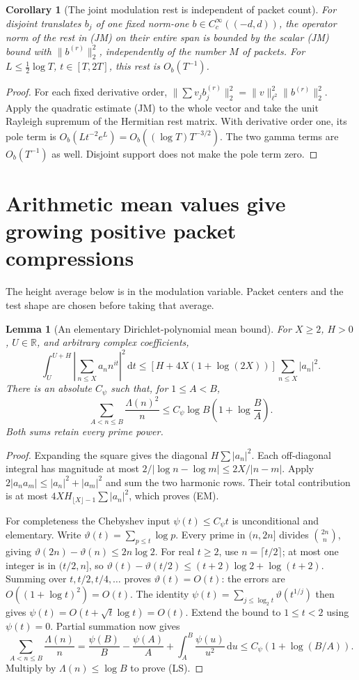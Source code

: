 \documentclass[11pt]{article}
\newtheorem{lemma}[theorem]{Lemma}
\newtheorem{corollary}[theorem]{Corollary}
\theoremstyle{remark}\newtheorem{remark}[theorem]{Remark}
\newcommand{\R}{\mathbb R}
\newcommand{\dd}{\,\mathrm d}
\begin{document}
\begin{corollary}[The joint modulation rest is independent of packet count]
\label{cor:dimension-free-rest}
For disjoint translates $b_j$ of one fixed norm-one
$b\in C_c^\infty((-d,d))$, the operator norm of the rest in (JM)
on their entire span is bounded by the scalar (JM) bound with
$\|b^{(r)}\|_2^2$, independently of the number $M$ of packets.
For $L\le\frac12\log T$, $t\in[T,2T]$, this rest is $O_b(T^{-1})$.
\end{corollary}
\begin{proof}
For each fixed derivative order,
$\|\sum v_jb_j^{(r)}\|_2^2=\|v\|_{\ell^2}^2\|b^{(r)}\|_2^2$.
Apply the quadratic estimate (JM) to the whole vector and take
the unit Rayleigh supremum of the Hermitian rest matrix.
With derivative order one, its pole term is
$O_b(Lt^{-2}e^L)=O_b((\log T)T^{-3/2})$.
The two gamma terms are $O_b(T^{-1})$ as well.
Disjoint support does not make the pole term zero.
\end{proof}

\section{Arithmetic mean values give growing positive packet compressions}
The height average below is in the modulation variable. Packet centers
and the test shape are chosen before taking that average.

\begin{lemma}[An elementary Dirichlet-polynomial mean bound]
\label{lem:elementary-mean}
For $X\ge2$, $H>0$, $U\in\R$, and arbitrary complex coefficients,
\[
 \int_U^{U+H}\left|\sum_{n\le X}a_n n^{it}\right|^2\dd t
 \le[H+4X(1+\log(2X))]\sum_{n\le X}|a_n|^2.       \tag{EM}
\]
There is an absolute $C_\psi$ such that, for $1\le A<B$,
\[
 \sum_{A<n\le B}\frac{\Lambda(n)^2}{n}
 \le C_\psi\log B\left(1+\log\frac BA\right).       \tag{LS}
\]
Both sums retain every prime power.
\end{lemma}
\begin{proof}
Expanding the square gives the diagonal $H\sum|a_n|^2$.
Each off-diagonal integral has magnitude at most
$2/|\log n-\log m|\le2X/|n-m|$.
Apply $2|a_na_m|\le|a_n|^2+|a_m|^2$ and sum the two
harmonic rows. Their total contribution is at most
$4XH_{\lfloor X\rfloor-1}\sum|a_n|^2$, which proves (EM).

For completeness the Chebyshev input $\psi(t)\le C_\psi t$
is unconditional and elementary. Write
$\vartheta(t)=\sum_{p\le t}\log p$.
Every prime in $(n,2n]$ divides $\binom{2n}{n}$, giving
$\vartheta(2n)-\vartheta(n)\le2n\log2$.
For real $t\ge2$, use $n=\lceil t/2\rceil$; at most one
integer is in $(t/2,n]$, so
$\vartheta(t)-\vartheta(t/2)\le(t+2)\log2+\log(t+2)$.
Summing over $t,t/2,t/4,\ldots$ proves $\vartheta(t)=O(t)$:
the errors are $O((1+\log t)^2)=O(t)$.
The identity $\psi(t)=\sum_{j\le\log_2t}\vartheta(t^{1/j})$
then gives $\psi(t)=O(t+\sqrt t\log t)=O(t)$.
Extend the bound to $1\le t<2$ using $\psi(t)=0$.
Partial summation now gives
\[
 \sum_{A<n\le B}\frac{\Lambda(n)}n
 =\frac{\psi(B)}B-\frac{\psi(A)}A
                   +\int_A^B\frac{\psi(u)}{u^2}\dd u
 \le C_\psi(1+\log(B/A)).
\]
Multiply by $\Lambda(n)\le\log B$ to prove (LS).
\end{proof}
\end{document}
